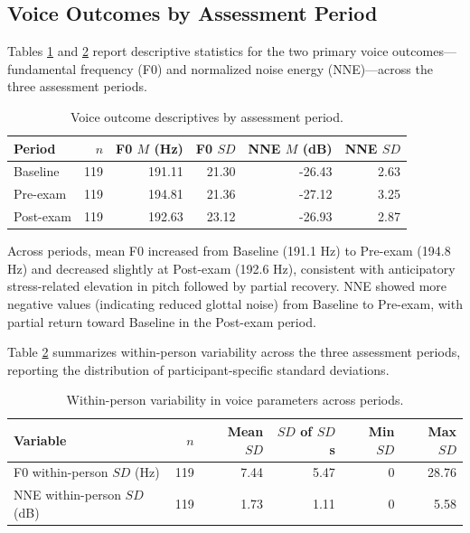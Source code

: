 \documentclass[
  english,
  man,floatsintext]{apa6}
\begin{document}
\subsection{Voice Outcomes by Assessment Period}\label{voice-outcomes-by-assessment-period}

Tables \ref{tab:table-s4-voice} and \ref{tab:table-s5-voice-variability} report descriptive statistics for the two primary voice outcomes---fundamental frequency (F0) and normalized noise energy (NNE)---across the three assessment periods.

\begin{table}

\caption{\label{tab:table-s4-voice}Voice outcome descriptives by assessment period.}
\centering
\begin{tabular}[t]{lrrrrr}
\toprule
Period & $n$ & F0 $M$ (Hz) & F0 $SD$ & NNE $M$ (dB) & NNE $SD$\\
\midrule
Baseline & 119 & 191.11 & 21.30 & -26.43 & 2.63\\
Pre-exam & 119 & 194.81 & 21.36 & -27.12 & 3.25\\
Post-exam & 119 & 192.63 & 23.12 & -26.93 & 2.87\\
\bottomrule
\end{tabular}
\end{table}

Across periods, mean F0 increased from Baseline (191.1 Hz) to Pre-exam (194.8 Hz) and decreased slightly at Post-exam (192.6 Hz), consistent with anticipatory stress-related elevation in pitch followed by partial recovery. NNE showed more negative values (indicating reduced glottal noise) from Baseline to Pre-exam, with partial return toward Baseline in the Post-exam period.

Table \ref{tab:table-s5-voice-variability} summarizes within-person variability across the three assessment periods, reporting the distribution of participant-specific standard deviations.

\begin{table}

\caption{\label{tab:table-s5-voice-variability}Within-person variability in voice parameters across periods.}
\centering
\begin{tabular}[t]{lrrrrr}
\toprule
Variable & $n$ & Mean $SD$ & $SD$ of $SD$s & Min $SD$ & Max $SD$\\
\midrule
F0 within-person $SD$ (Hz) & 119 & 7.44 & 5.47 & 0 & 28.76\\
NNE within-person $SD$ (dB) & 119 & 1.73 & 1.11 & 0 & 5.58\\
\bottomrule
\end{tabular}
\end{table}
\end{document}
